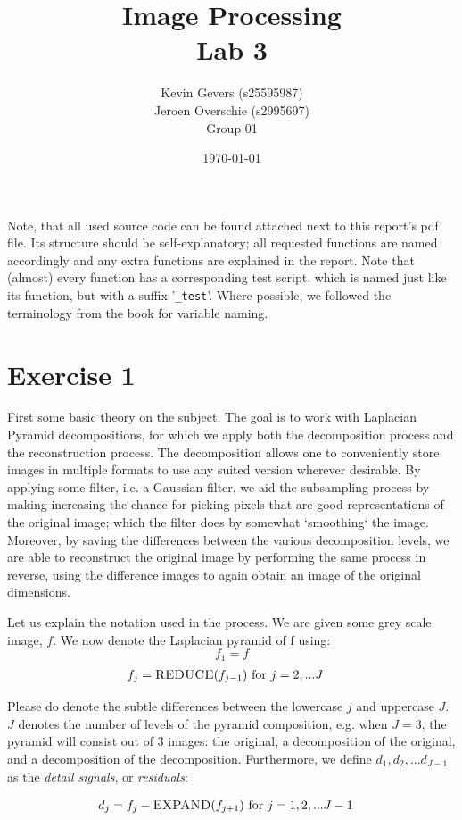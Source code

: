 \documentclass{article}
\title{Image Processing\\
    Lab 3}
\author{Kevin Gevers (s25595987) \\ Jeroen Overschie (s2995697)\\Group 01}
\date{\today}
\begin{document}
\maketitle

Note, that all used source code can be found attached next to this report's pdf file. Its structure should be self-explanatory; all requested functions are named accordingly and any extra functions are explained in the report. Note that (almost) every function has a corresponding test script, which is named just like its function, but with a suffix '\texttt{\_test}'. Where possible, we followed the terminology from the book \citep{gonzalez2008digital} for variable naming.

\section*{Exercise 1}
First some basic theory on the subject. The goal is to work with Laplacian Pyramid decompositions, for which we apply both the decomposition process and the reconstruction process. The decomposition allows one to conveniently store images in multiple formats to use any suited version wherever desirable. By applying some filter, i.e. a Gaussian filter, we aid the subsampling process by making increasing the chance for picking pixels that are good representations of the original image; which the filter does by somewhat `smoothing` the image. Moreover, by saving the differences between the various decomposition levels, we are able to reconstruct the original image by performing the same process in reverse, using the difference images to again obtain an image of the original dimensions.

Let us explain the notation used in the process. We are given some grey scale image, $f$. We now denote the Laplacian pyramid of f using:
\[
    f_1 = f
\]
\[
\begin{aligned}
    f_j = \textsc{REDUCE}(f_{j-1}) & \text{  for $j=2,...J$}
\end{aligned}
\]

Please do denote the subtle differences between the lowercase $j$ and uppercase $J$. $J$ denotes the number of levels of the pyramid composition, e.g. when $J = 3$, the pyramid will consist out of 3 images: the original, a decomposition of the original, and a decomposition of the decomposition. Furthermore, we define $d_1,d_2,...d_{J-1}$ as the \textit{detail signals}, or \textit{residuals}:

\[
\begin{aligned}
    d_j = f_j - \textsc{EXPAND}(f_{j+1}) & \text{  for $j=1,2,...J-1$}
\end{aligned}
\]
\end{document}
